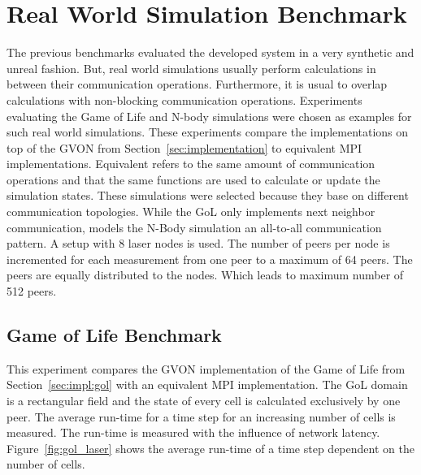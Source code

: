 \section{Real World Simulation Benchmark}
\label{sec:eval:real}
The previous benchmarks evaluated the developed system in a very
synthetic and unreal fashion. But, real world simulations usually
perform calculations in between their communication
operations. Furthermore, it is usual to overlap calculations with
non-blocking communication operations. Experiments evaluating the Game
of Life and N-body simulations were chosen as examples for such real
world simulations. These experiments compare the implementations on
top of the GVON from Section~\ref{sec:implementation} to equivalent
MPI implementations. Equivalent refers to the same amount of
communication operations and that the same functions are used to
calculate or update the simulation states. These simulations were
selected because they base on different communication
topologies. While the GoL only implements next neighbor communication,
models the N-Body simulation an all-to-all communication pattern.  A
setup with 8 laser nodes is used. The number of peers per node is
incremented for each measurement from one peer to a maximum of 64
peers. The peers are equally distributed to the nodes.  Which leads to
maximum number of 512 peers.


\subsection{Game of Life Benchmark}
This experiment compares the GVON implementation of the Game of Life
from Section~\ref{sec:impl:gol} with an equivalent MPI
implementation. The GoL domain is a rectangular field and the state of
every cell is calculated exclusively by one peer. The average run-time
for a time step for an increasing number of cells is measured. The
run-time is measured with the influence of network latency.
Figure~\ref{fig:gol_laser} shows the average run-time of a time step
dependent on the number of cells.

